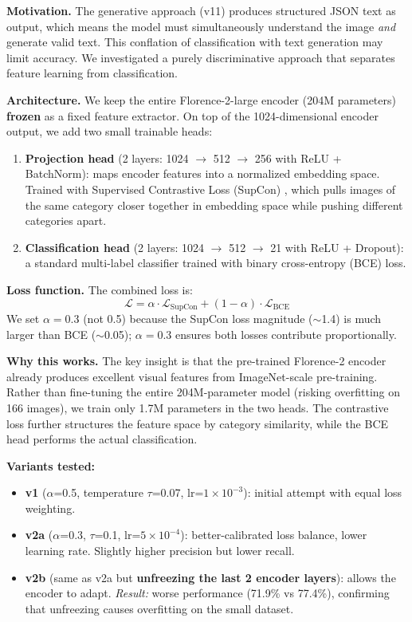 \documentclass[11pt]{article}
\begin{document}
\textbf{Motivation.} The generative approach (v11) produces structured JSON text as output, which means the model must simultaneously understand the image \textit{and} generate valid text. This conflation of classification with text generation may limit accuracy. We investigated a purely discriminative approach that separates feature learning from classification.

\textbf{Architecture.} We keep the entire Florence-2-large encoder (204M parameters) \textbf{frozen} as a fixed feature extractor. On top of the 1024-dimensional encoder output, we add two small trainable heads:
\begin{enumerate}[nosep,leftmargin=1.5em]
  \item \textbf{Projection head} (2 layers: 1024 $\rightarrow$ 512 $\rightarrow$ 256 with ReLU + BatchNorm): maps encoder features into a normalized embedding space. Trained with Supervised Contrastive Loss (SupCon) \cite{khosla2020supcon}, which pulls images of the same category closer together in embedding space while pushing different categories apart.
  \item \textbf{Classification head} (2 layers: 1024 $\rightarrow$ 512 $\rightarrow$ 21 with ReLU + Dropout): a standard multi-label classifier trained with binary cross-entropy (BCE) loss.
\end{enumerate}

\textbf{Loss function.} The combined loss is:
\[
\mathcal{L} = \alpha \cdot \mathcal{L}_{\text{SupCon}} + (1 - \alpha) \cdot \mathcal{L}_{\text{BCE}}
\]
We set $\alpha = 0.3$ (not 0.5) because the SupCon loss magnitude ($\sim$1.4) is much larger than BCE ($\sim$0.05); $\alpha = 0.3$ ensures both losses contribute proportionally.

\textbf{Why this works.} The key insight is that the pre-trained Florence-2 encoder already produces excellent visual features from ImageNet-scale pre-training. Rather than fine-tuning the entire 204M-parameter model (risking overfitting on 166 images), we train only 1.7M parameters in the two heads. The contrastive loss further structures the feature space by category similarity, while the BCE head performs the actual classification.

\textbf{Variants tested:}
\begin{itemize}[nosep,leftmargin=1.5em]
  \item \textbf{v1} ($\alpha$=0.5, temperature $\tau$=0.07, lr=$1 \times 10^{-3}$): initial attempt with equal loss weighting.
  \item \textbf{v2a} ($\alpha$=0.3, $\tau$=0.1, lr=$5 \times 10^{-4}$): better-calibrated loss balance, lower learning rate. Slightly higher precision but lower recall.
  \item \textbf{v2b} (same as v2a but \textbf{unfreezing the last 2 encoder layers}): allows the encoder to adapt. \textit{Result:} worse performance (71.9\% vs 77.4\%), confirming that unfreezing causes overfitting on the small dataset.
\end{itemize}
\end{document}
